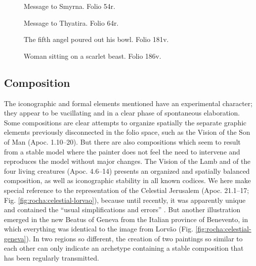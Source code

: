 \begin{paper}
\begin{figure}[H]
\begin{minipage}[b]{0.45\textwidth}
    \centering
    \caption{Message to Smyrna. Folio 54r.}
    \label{fig:rocha:smyrna}
    \end{minipage}
    \hfill
    \begin{minipage}[b]{0.45\textwidth}
    \centering
    \caption{Message to Thyatira. Folio 64r.}
    \label{fig:rocha:thyatira}
    \end{minipage}
\end{figure}
\vfill
\newpage
\begin{figure}[H]
  \begin{minipage}[b]{0.45\textwidth}
    \centering
    \caption{The fifth angel poured out his bowl. Folio 181v.}
    \label{fig:rocha:angel}
\end{minipage}
\hfill
  \begin{minipage}[b]{0.45\textwidth}
    \centering
    \caption{Woman sitting on a scarlet beast. Folio 186v.}
    \label{fig:rocha:scarlet}
    \end{minipage}
\end{figure}

\subsection*{Composition}

The iconographic and formal elements mentioned have an experimental
character; they appear to be vacillating and in a clear phase of
spontaneous elaboration. Some compositions are clear attempts to
organize spatially the separate graphic elements previously disconnected
in the folio space, such as the Vision of the Son of Man (Apoc.
1.10--20). But there are also compositions which seem to result from a
stable model where the painter does not feel the need to intervene and
reproduces the model without major changes. The Vision of the Lamb and
of the four living creatures (Apoc. 4.6--14) presents an organized and
spatially balanced composition, as well as iconographic stability in all
known codices. We here make special reference to the representation of
the Celestial Jerusalem (Apoc. 21.1--17; Fig. \ref{fig:rocha:celestial-lorvao}), because until
recently, it was apparently unique and contained the ``usual
simplifications and errors'' \citep[136]{klein_beato_2004}. But another illustration
emerged in the new Beatus of Geneva from the Italian province of
Benevento, in which everything was identical to the image from Lorvão
(Fig. \ref{fig:rocha:celestial-geneva}). In two regions so different, the creation of two paintings so
similar to each other can only indicate an archetype containing a stable
composition that has been regularly transmitted.


\end{paper}
